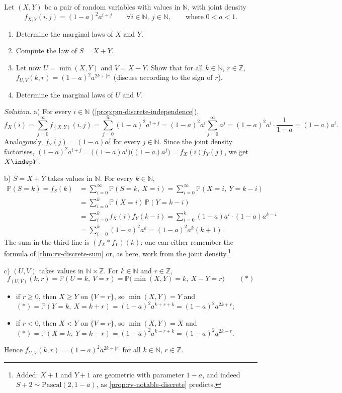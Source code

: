 \begin{example}\label{exa:rv-geometric-pair}
Let $(X,Y)$ be a pair of random variables with values in $\mathbb N$, with joint density
\[
  f_{X,Y}(i,j)=(1-a)^2a^{i+j}\qquad\forall i\in\mathbb N,\ j\in\mathbb N,\qquad\text{where }0<a<1 .
\]
\begin{enumerate}[label=\alph*)]
  \item Determine the marginal laws of $X$ and $Y$.
  \item Compute the law of $S=X+Y$.
  \item Let now $U=\min(X,Y)$ and $V=X-Y$. Show that for all $k\in\mathbb N$, $r\in\mathbb Z$,
    $f_{U,V}(k,r)=(1-a)^2a^{2k+|r|}$ (discuss according to the sign of $r$).
  \item Determine the marginal laws of $U$ and $V$.
\end{enumerate}

\emph{Solution.} a) For every $i\in\mathbb N$ (\cref{prop:pm-discrete-independence}),
\[
  f_X(i)=\sum_{j=0}^\infty f_{(X,Y)}(i,j)=\sum_{j=0}^\infty(1-a)^2a^{i+j}=(1-a)^2a^i\sum_{j=0}^\infty a^j
  =(1-a)^2a^i\cdot\frac1{1-a}=(1-a)a^i .
\]
Analogously, $f_Y(j)=(1-a)a^j$ for every $j\in\mathbb N$. Since the joint density factorises,
$(1-a)^2a^{i+j}=\big((1-a)a^i\big)\big((1-a)a^j\big)=f_X(i)f_Y(j)$, we get $X\indep Y$.

b) $S=X+Y$ takes values in $\mathbb N$. For every $k\in\mathbb N$,
\[
\begin{aligned}
  \mathbb P(S=k)=f_S(k)&=\sum_{i=0}^\infty\mathbb P(S=k,\ X=i)=\sum_{i=0}^\infty\mathbb P(X=i,\ Y=k-i)\\
  &=\sum_{i=0}^k\mathbb P(X=i)\,\mathbb P(Y=k-i)\\
  &=\sum_{i=0}^kf_X(i)f_Y(k-i)=\sum_{i=0}^k(1-a)a^i\cdot(1-a)a^{k-i}\\
  &=\sum_{i=0}^k(1-a)^2a^k=(1-a)^2a^k(k+1).
\end{aligned}
\]
The sum in the third line is $(f_X*f_Y)(k)$: one can either remember the formula of
\cref{thm:rv-discrete-sum} or, as here, work from the joint density.\footnote{Added: $X+1$ and $Y+1$
are geometric with parameter $1-a$, and indeed $S+2\sim\mathrm{Pascal}(2,1-a)$, as
\cref{prop:rv-notable-discrete} predicts.}

c) $(U,V)$ takes values in $\mathbb N\times\mathbb Z$. For $k\in\mathbb N$ and $r\in\mathbb Z$,
\[
  f_{(U,V)}(k,r)=\mathbb P(U=k,\ V=r)=\mathbb P\big(\min(X,Y)=k,\ X-Y=r\big)\qquad(*)
\]
\begin{itemize}
  \item if $r\ge0$, then $X\ge Y$ on $\{V=r\}$, so $\min(X,Y)=Y$ and
    $(*)=\mathbb P(Y=k,\ X=k+r)=(1-a)^2a^{k+r+k}=(1-a)^2a^{2k+r}$;
  \item if $r<0$, then $X<Y$ on $\{V=r\}$, so $\min(X,Y)=X$ and
    $(*)=\mathbb P(X=k,\ Y=k-r)=(1-a)^2a^{k-r+k}=(1-a)^2a^{2k-r}$.
\end{itemize}
Hence $f_{U,V}(k,r)=(1-a)^2a^{2k+|r|}$ for all $k\in\mathbb N$, $r\in\mathbb Z$.


\end{example}

